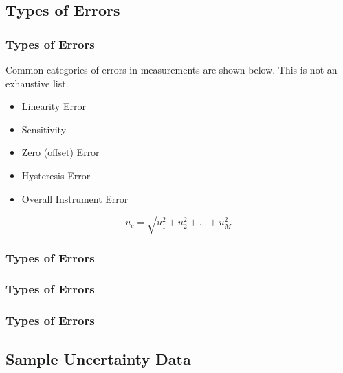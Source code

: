 \documentclass[fleqn]{beamer} %
\newcommand{\sectionIIsubsectionIIItitle}{Types of Errors}
\newcommand{\sectionIIsubsectionIVtitle}{Sample Uncertainty Data}
\begin{document}
		\subsection{\sectionIIsubsectionIIItitle}\label{sectionIIsubsectionIII}

			\begin{frame}
				\frametitle{\sectionIIsubsectionIIItitle}

				Common categories of errors in measurements are shown below. This is not an exhaustive list.  

				\begin{itemize}
					
					\item Linearity Error \vspc
					\item Sensitivity \vspc
					\item Zero (offset) Error \vspc
					\item Hysteresis Error \vspc
					\item Overall Instrument Error \vspc
				\end{itemize}

				\[u_c=\sqrt{u_1^2+u_2^2+...+u_M^2}\]

			\end{frame}		

			\begin{frame}
				\frametitle{\sectionIIsubsectionIIItitle}

				

			\end{frame}

			\begin{frame}
				\frametitle{\sectionIIsubsectionIIItitle}

			\end{frame}

			\begin{frame}
			\frametitle{\sectionIIsubsectionIIItitle}





			\end{frame}

		\subsection{\sectionIIsubsectionIVtitle}\label{sectionIIsubsectionIV}
\end{document}
